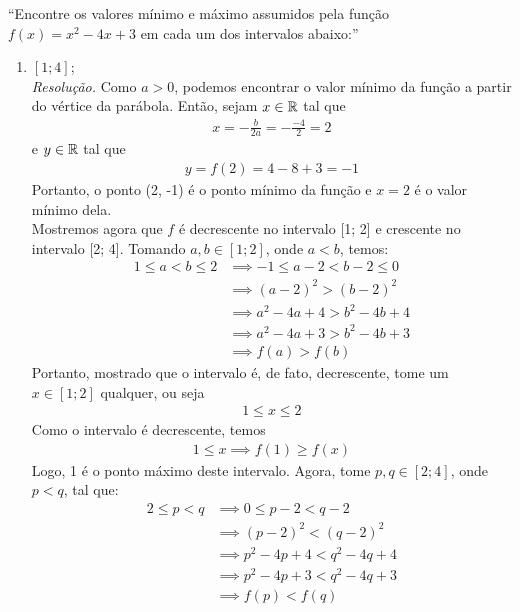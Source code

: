 \enquote{Encontre os valores mínimo e máximo assumidos pela função $f(x) = x^2 - 4x + 3$ em cada um dos intervalos abaixo:}
\begin{enumerate}
    \item $[1; 4]$; \\
    \emph{Resolução.} Como $a > 0$, podemos encontrar o valor mínimo da função a partir do vértice da parábola. Então, sejam $x \in \mathbb R$ tal que
    \begin{align*}
        x = -\frac{b}{2a} = -\frac{-4}{2} = 2
    \end{align*}
    e $y \in \mathbb R$ tal que 
    \begin{align*}
        y = f(2) = 4 - 8 + 3 = -1
    \end{align*}
    Portanto, o ponto (2, -1) é o ponto mínimo da função e $x = 2$ é o valor mínimo dela. \\
    Mostremos agora que $f$ é decrescente no intervalo [1; 2] e crescente no intervalo [2; 4]. Tomando $a, b \in [1; 2]$, onde $a < b$, temos:
    \begin{align*}
        1 \le a < b \le 2 & \implies -1 \le a - 2 < b - 2 \le 0 \\ & \implies
        (a - 2)^2 > (b - 2)^2 \\ & \implies
        a^2 - 4a + 4 > b^2 - 4b + 4 \\ & \implies
        a^2 - 4a + 3 > b^2 - 4b + 3 \\ & \implies
        f(a) > f(b)
    \end{align*}
    Portanto, mostrado que o intervalo é, de fato, decrescente, tome um $x \in [1; 2]$ qualquer, ou seja
    \begin{align*}
        1 \le x \le 2
    \end{align*}
    Como o intervalo é decrescente, temos
    \begin{align*}
        1 \le x \implies f(1) \ge f(x)
    \end{align*}
    Logo, 1 é o ponto máximo deste intervalo. Agora, tome $p, q \in [2;4]$, onde $p < q$, tal que:
    \begin{align*}
        2 \le p < q & \implies 0 \le p - 2 < q - 2 \\ & \implies
        (p - 2)^2 < (q - 2)^2 \\ & \implies
        p^2 - 4p + 4 < q^2 - 4q + 4 \\ & \implies
        p^2 - 4p + 3 < q^2 - 4q + 3 \\ & \implies 
        f(p) < f(q)
    \end{align*}

\end{enumerate}
